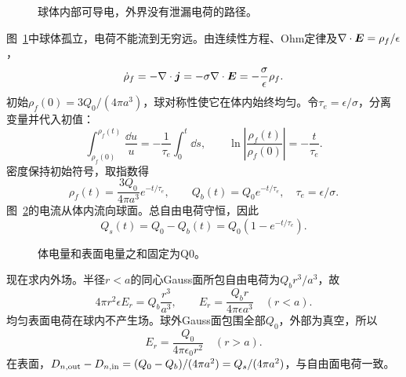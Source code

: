 \begin{figure}[H]\centering
{}
\caption{球体内部可导电，外界没有泄漏电荷的路径。}\label{fig:i3-e2-q}
\end{figure}
\begin{solution}
图~\ref{fig:i3-e2-q}中球体孤立，电荷不能流到无穷远。由连续性方程、Ohm定律及$\nabla\cdot\bm{E}=\rho_f/\epsilon$，
\[
\dot\rho_f=-\nabla\cdot\bm{j}
=-\sigma\nabla\cdot\bm{E}=-\frac{\sigma}{\epsilon}\rho_f.
\]
初始$\rho_f(0)=3Q_0/(4\pi a^3)$，球对称性使它在体内始终均匀。令$\tau_e=\epsilon/\sigma$，分离变量并代入初值：
\[\int_{\rho_f(0)}^{\rho_f(t)}\frac{\dd u}u
=-\frac1{\tau_e}\int_0^t\dd s,\qquad
\ln\left|\frac{\rho_f(t)}{\rho_f(0)}\right|=-\frac t{\tau_e}.\]
密度保持初始符号，取指数得
\[
\rho_f(t)=\frac{3Q_0}{4\pi a^3}e^{-t/\tau_e},\qquad
\boxed{Q_b(t)=Q_0e^{-t/\tau_e}},\quad\tau_e=\epsilon/\sigma.
\]
图~\ref{fig:i3-e2-s}的电流从体内流向球面。总自由电荷守恒，因此
\[
\boxed{Q_s(t)=Q_0-Q_b(t)=Q_0(1-e^{-t/\tau_e})}.
\]
\begin{figure}[H]\centering
{}
\caption{体电量和表面电量之和固定为Q0。}\label{fig:i3-e2-s}
\end{figure}
现在求内外场。半径$r<a$的同心Gauss面所包自由电荷为$Q_b r^3/a^3$，故
\[
4\pi r^2\epsilon E_r=Q_b\frac{r^3}{a^3},\qquad
\boxed{E_r=\frac{Q_b r}{4\pi\epsilon a^3}}\quad(r<a).
\]
均匀表面电荷在球内不产生场。球外Gauss面包围全部$Q_0$，外部为真空，所以
\[
\boxed{E_r=\frac{Q_0}{4\pi\epsilon_0r^2}}\quad(r>a).
\]
在表面，$D_{n,\rm out}-D_{n,\rm in}=(Q_0-Q_b)/(4\pi a^2)=Q_s/(4\pi a^2)$，与自由面电荷一致。


\end{solution}
